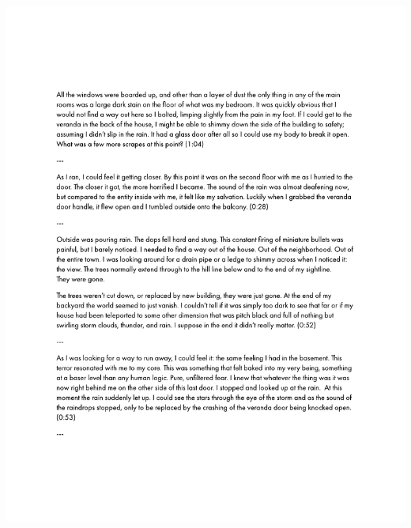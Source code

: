\begin{center}
     \includegraphics[scale=0.75]{Scores/raindrops_Part22.pdf}
\end{center}
\newpage

